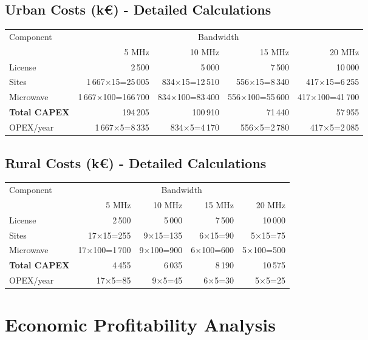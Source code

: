 \documentclass[a4paper,12pt]{article}
\begin{document}
\subsection*{Urban Costs (k€) - Detailed Calculations}
\begin{center}
\begin{tabular}{@{}l *{4}{r}@{}}
\toprule
Component & \multicolumn{4}{c}{Bandwidth} \\
\cmidrule(lr){2-5}
 & 5 MHz & 10 MHz & 15 MHz & 20 MHz \\
\midrule
License & 2\,500 & 5\,000 & 7\,500 & 10\,000 \\
Sites & 1\,667×15=25\,005 & 834×15=12\,510 & 556×15=8\,340 & 417×15=6\,255 \\
Microwave & 1\,667×100=166\,700 & 834×100=83\,400 & 556×100=55\,600 & 417×100=41\,700 \\
\midrule
\textbf{Total CAPEX} & 194\,205 & 100\,910 & 71\,440 & 57\,955 \\
OPEX/year & 1\,667×5=8\,335 & 834×5=4\,170 & 556×5=2\,780 & 417×5=2\,085 \\
\bottomrule
\end{tabular}
\end{center}

\subsection*{Rural Costs (k€) - Detailed Calculations}
\begin{center}
\begin{tabular}{@{}l *{4}{r}@{}}
\toprule
Component & \multicolumn{4}{c}{Bandwidth} \\
\cmidrule(lr){2-5}
 & 5 MHz & 10 MHz & 15 MHz & 20 MHz \\
\midrule
License & 2\,500 & 5\,000 & 7\,500 & 10\,000 \\
Sites & 17×15=255 & 9×15=135 & 6×15=90 & 5×15=75 \\
Microwave & 17×100=1\,700 & 9×100=900 & 6×100=600 & 5×100=500 \\
\midrule
\textbf{Total CAPEX} & 4\,455 & 6\,035 & 8\,190 & 10\,575 \\
OPEX/year & 17×5=85 & 9×5=45 & 6×5=30 & 5×5=25 \\
\bottomrule
\end{tabular}
\end{center}

\section{Economic Profitability Analysis}
\end{document}
